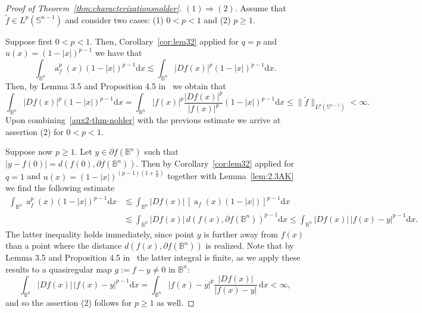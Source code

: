 \documentclass[11pt,a4paper,reqno]{amsart}
\theoremstyle{definition}
\renewcommand{\a}{\operatorname{a}}
\newcommand{\B}{\mathbb{B}^n}
\newcommand{\ud}{\mathrm {d}}
\newcommand{\Sn}{\mathbb{S}^{n-1}}
\numberwithin{komcounter}{section}
\begin{document}
\begin{proof}[Proof of Theorem~\ref{thm:characterizationsnolder}] 
\noindent $(1)\Rightarrow (2)$. Assume that $\tilde{f}\in L^p(\Sn)$ and consider two cases: (1) $0<p<1$ and (2) $p\geq 1$.
\smallskip

Suppose first $0<p<1$. Then, Corollary~\ref{cor:lem32} applied for $q=p$ and $u(x)=(1-|x|)^{p-1}$ we have that
\begin{equation*}
\int_{\B}\a_{f}^p(x)(1-|x|)^{p-1} \ud x\lesssim \int_{\B}|Df(x)|^p(1-|x|)^{p-1}\ud x.
\end{equation*}
Then, by Lemma 3.5 and Proposition 4.5 in~\cite{ag2} we obtain that
\begin{equation}\label{aux2-thm-nolder}
\int_{\B}|Df(x)|^p(1-|x|)^{p-1}\ud x =\int_{\B}|f(x)|^p\frac{|Df(x)|^p}{|f(x)|^p}(1-|x|)^{p-1}\ud x \leq \| \tilde{f}\|_{L^p(\Sn)}<\infty.
\end{equation}
Upon combining~\eqref{aux2-thm-nolder} with the previous estimate we arrive at assertion (2) for $0<p<1$.

Suppose now $p\geq 1$. Let $y\in\partial f(\B)$ such that $|y-f(0)|=d(f(0),\partial f(\B))$. Then by Corollary~\ref{cor:lem32} applied for~$q=1$ and $u(x)=(1-|x|)^{(p-1)(1+\frac{a}{n})}$ together with Lemma~\ref{lem:2.3AK} we find the following estimate
	\begin{align*}
	\int_{\B}\a_f^p(x)(1-|x|)^{p-1}\ud x &\lesssim\! \int_{\B}|Df(x)|\, \left[\a_{f}(x)(1-|x|)\right]^{p-1}\ud x \label{aux12: lem25AK} \\
	&\lesssim\!\! \int_{\B}|Df(x)|\, d(f(x),\partial f(\B ))^{p-1}\ud x \leq\! \int_{\B}|Df(x)|\, |f(x)-y|^{p-1}\ud x. \nonumber
	\end{align*}
  The latter inequality holds immediately, since point $y$ is further away from $f(x)$ than a point where the distance $d(f(x),\partial f(\B))$ is realized. Note that by Lemma 3.5 and Proposition 4.5 in~\cite{ag2} the latter integral is finite, as we apply these results to a quasiregular map $g:=f-y\not=0$ in $\B$:
	\[ 
	\int_{\B}|Df(x)|\, |f(x)-y|^{p-1} \ud x=\int_{\B}|f(x)-y|^{p} \frac{|Df(x)|}{|f(x)-y|}\, \ud x<\infty,
	\]
and so the assertion (2) follows for $p\geq 1$ as well.
\smallskip


\end{proof}
\end{document}
